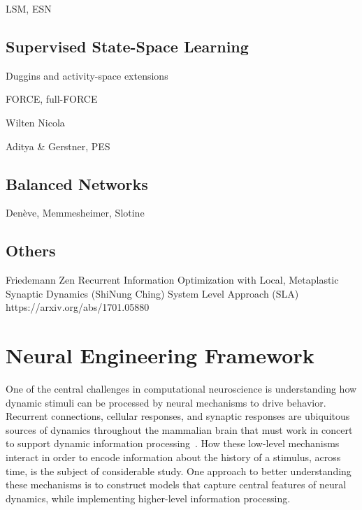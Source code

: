 LSM, ESN

\subsection{Supervised State-Space Learning}

Duggins and activity-space extensions

FORCE, full-FORCE

Wilten Nicola

Aditya \& Gerstner, PES

\subsection{Balanced Networks}

Den\`eve, Memmesheimer, Slotine

\subsection{Others}

Friedemann Zen
Recurrent Information Optimization with Local, Metaplastic Synaptic Dynamics (ShiNung Ching)
System Level Approach (SLA) https://arxiv.org/abs/1701.05880


\section{Neural Engineering Framework}
\label{sec:nef}


\citep{hunsberger2015spiking, hunsberger2016training, hunsberger2018, rasmussen2018nengodl}

One of the central challenges in computational neuroscience is understanding how dynamic stimuli can be processed by neural mechanisms to drive behavior.
Recurrent connections, cellular responses, and synaptic responses are ubiquitous sources of dynamics throughout the mammalian brain that must work in concert to support dynamic information processing~\citep{kandel2000principles}.
How these low-level mechanisms interact in order to encode information about the history of a stimulus, across time, is the subject of considerable study.
One approach to better understanding these mechanisms is to construct models that capture central features of neural dynamics, while implementing higher-level information processing.



